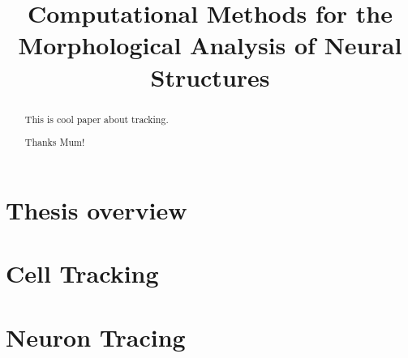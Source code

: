 \documentclass[b5,12pt]{report}
\title{Computational Methods for the Morphological Analysis of Neural Structures}
\begin{document}
\maketitle
\begin{abstract}
 This is cool paper about tracking.
\end{abstract}
\renewcommand{\abstractname}{Acknowledgements}
\begin{abstract}
 Thanks Mum!
\end{abstract}

\tableofcontents
\listoffigures
\part{Thesis overview}

\part{Cell Tracking}
\part{Neuron Tracing}




\end{document}
